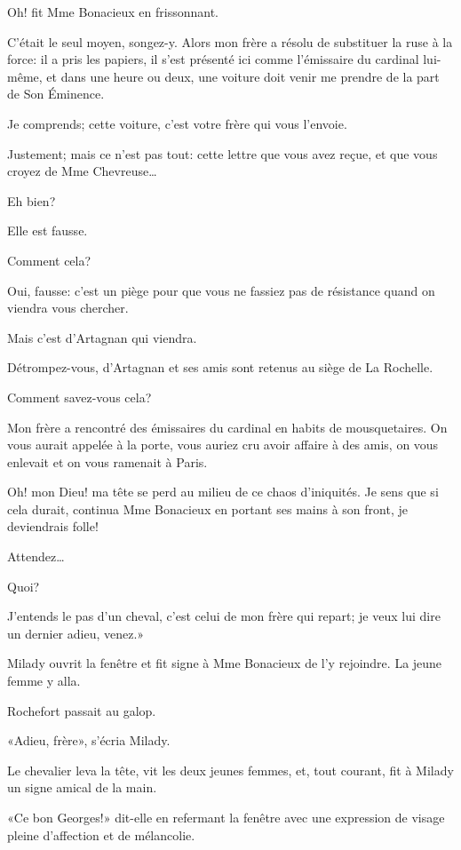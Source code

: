 \speak  Oh! fit Mme Bonacieux en frissonnant. 

\speak  C'était le seul moyen, songez-y. Alors mon frère a résolu de substituer la ruse à la force: il a pris les papiers, il s'est présenté ici comme l'émissaire du cardinal lui-même, et dans une heure ou deux, une voiture doit venir me prendre de la part de Son Éminence. 

\speak  Je comprends; cette voiture, c'est votre frère qui vous l'envoie. 

\speak  Justement; mais ce n'est pas tout: cette lettre que vous avez reçue, et que vous croyez de Mme Chevreuse\dots 

\speak  Eh bien? 

\speak  Elle est fausse. 

\speak  Comment cela? 

\speak  Oui, fausse: c'est un piège pour que vous ne fassiez pas de résistance quand on viendra vous chercher. 

\speak  Mais c'est d'Artagnan qui viendra. 

\speak  Détrompez-vous, d'Artagnan et ses amis sont retenus au siège de La Rochelle. 

\speak  Comment savez-vous cela? 

\speak  Mon frère a rencontré des émissaires du cardinal en habits de mousquetaires. On vous aurait appelée à la porte, vous auriez cru avoir affaire à des amis, on vous enlevait et on vous ramenait à Paris. 

\speak  Oh! mon Dieu! ma tête se perd au milieu de ce chaos d'iniquités. Je sens que si cela durait, continua Mme Bonacieux en portant ses mains à son front, je deviendrais folle! 

\speak  Attendez\dots 

\speak  Quoi? 

\speak  J'entends le pas d'un cheval, c'est celui de mon frère qui repart; je veux lui dire un dernier adieu, venez.» 

Milady ouvrit la fenêtre et fit signe à Mme Bonacieux de l'y rejoindre. La jeune femme y alla. 

Rochefort passait au galop. 

«Adieu, frère», s'écria Milady. 

Le chevalier leva la tête, vit les deux jeunes femmes, et, tout courant, fit à Milady un signe amical de la main. 

«Ce bon Georges!» dit-elle en refermant la fenêtre avec une expression de visage pleine d'affection et de mélancolie. 

